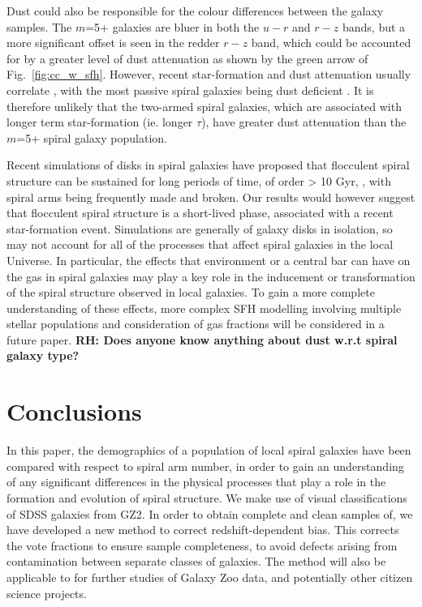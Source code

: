 \documentclass[useAMS,usenatbib]{mn2e}
\newcommand{\rh}[1]{{\bf \textcolor{RoyalPurple}{RH: #1}}}
\begin{document}
Dust could also be responsible for the colour differences between the galaxy samples. The $m$=5+ galaxies are bluer in both the $u-r$ and $r-z$ bands, but a more significant offset is seen in the redder $r-z$ band, which could be accounted for by a greater level of dust attenuation as shown by the green arrow of Fig.~\ref{fig:cc_w_sfh}. However, recent star-formation and dust attenuation usually correlate \citep{Garn_10}, with the most passive spiral galaxies being dust deficient \citep{Rowlands_12}. It is therefore unlikely that the two-armed spiral galaxies, which are associated with longer term star-formation (ie. longer $\tau$), have greater dust attenuation than the $m$=5+ spiral galaxy population. 

Recent simulations of disks in spiral galaxies have proposed that flocculent spiral structure can be sustained for long periods of time, of order > 10 Gyr, \citep{Fujii_11,Donghia_13}, with spiral arms being frequently made and broken. Our results would however suggest that flocculent spiral structure is a short-lived phase, associated with a recent star-formation event. Simulations are generally of galaxy disks in isolation, so may not account for all of the processes that affect spiral galaxies in the local Universe. In particular, the effects that environment or a central bar can have on the gas in spiral galaxies may play a key role in the inducement or transformation of the spiral structure observed in local galaxies. To gain a more complete understanding of these effects, more complex SFH modelling involving multiple stellar populations and consideration of gas fractions will be considered in a future paper. \rh{Does anyone know anything about dust w.r.t spiral galaxy type?} %
\section{Conclusions}
\label{sec:conclusions}

In this paper, the demographics of a population of local spiral galaxies have been compared with respect to spiral arm number, in order to gain an understanding of any significant differences in the physical processes that play a role in the formation and evolution of spiral structure. We make use of visual classifications of SDSS galaxies from GZ2. In order to obtain complete and clean samples of, we have developed a new method to correct redshift-dependent bias. This corrects the vote fractions to ensure sample completeness, to avoid defects arising from contamination between separate classes of galaxies. The method will also be applicable to for further studies of Galaxy Zoo data, and potentially other citizen science projects.
\end{document}
